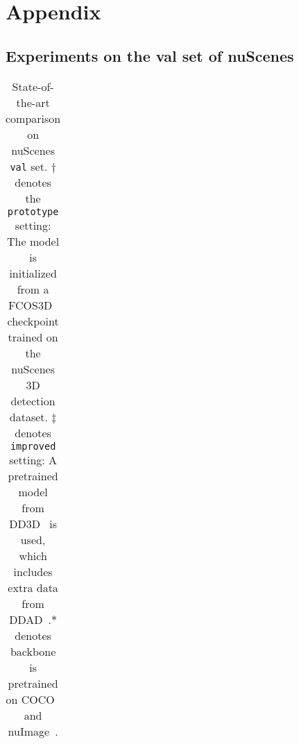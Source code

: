 \documentclass[letterpaper]{article} \usepackage{aaai23}  \usepackage{times}  \usepackage{helvet}  \usepackage{courier}  \usepackage[hyphens]{url}  \usepackage{graphicx} \urlstyle{rm} \def\UrlFont{\rm}  \usepackage{natbib}  \usepackage{caption} \frenchspacing  \setlength{\pdfpagewidth}{8.5in} \setlength{\pdfpageheight}{11in} \usepackage{algorithm}
\begin{document}
\appendix


\section{Appendix}

\subsection{Experiments on the val set of nuScenes}
\begin{table*}[t]
\footnotesize
  \centering
    \caption{
    State-of-the-art comparison on nuScenes \texttt{val} set. 
    $\dag$ denotes the \texttt{prototype} setting: The model is initialized from a FCOS3D~\cite{wang2021fcos3d} checkpoint trained on the nuScenes 3D detection dataset. 
    $\ddag$ denotes \texttt{improved} setting: A pretrained model from DD3D~\cite{park2021dd3d} is used, which includes extra data from DDAD~\cite{packnet}.$*$ denotes backbone is pretrained on COCO~\cite{lin2014microsoft} and nuImage~\cite{nuscenes2019}.}

\label{table:nusc_val}
\renewcommand{\arraystretch}{1.2}
    \begin{tabular}{lC{0.0cm}C{1cm}C{1.2cm}C{0.5cm}C{0.15cm}C{0.75cm}C{0.75cm}C{0.75cm}C{0.75cm}C{0.75cm}}
    \hline


\end{tabular}
\end{table*}
\end{document}
